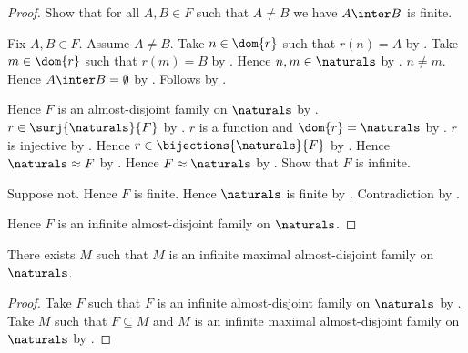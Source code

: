 \begin{proof}
    Show that for all $A,B\in F$ such that $A\neq B$
        we have $A\inter B$ is finite.
    \begin{subproof}
        Fix $A,B\in F$.
        Assume $A\neq B$.
        Take $n\in\dom{r}$ such that $r(n)=A$ by .
        Take $m\in\dom{r}$ such that $r(m)=B$ by .
        Hence $n,m\in\naturals$ by .
        $n\neq m$.
        Hence $A\inter B=\emptyset$
            by .
        Follows by .
    \end{subproof}
    Hence $F$ is an almost-disjoint family on $\naturals$
        by .
    $r\in\surj{\naturals}{F}$ by .
    $r$ is a function and $\dom{r}=\naturals$
        by .
    $r$ is injective by .
    Hence $r\in\bijections{\naturals}{F}$ by .
    Hence $\naturals\approx F$ by .
    Hence $F\approx\naturals$ by .
    Show that $F$ is infinite.
    \begin{subproof}
        Suppose not.
        Hence $F$ is finite.
        Hence $\naturals$ is finite by .
        Contradiction by .
    \end{subproof}
    Hence $F$ is an infinite almost-disjoint family on $\naturals$.
\end{proof}

\begin{theorem}\label{infinite_maximal_almost_disjoint_family_on_naturals_exists}
    There exists $M$ such that
        $M$ is an infinite maximal almost-disjoint family on $\naturals$.
\end{theorem}
\begin{proof}
    Take $F$ such that $F$ is an infinite almost-disjoint family on $\naturals$
        by .
    Take $M$ such that $F\subseteq M$ and
        $M$ is an infinite maximal almost-disjoint family on $\naturals$
        by .
\end{proof}
